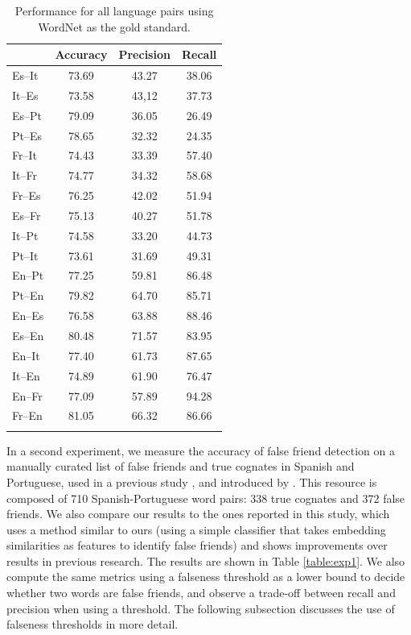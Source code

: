 \documentclass[output=paper]{langsci/langscibook}
\begin{document}
\vfill
\begin{table}[H]
\begin{tabular}{lccc}
\lsptoprule
& Accuracy & Precision & Recall\\
\midrule
Es--It & 73.69 & 43.27 & 38.06 \\
It--Es & 73.58 & 43,12 & 37.73 \\
Es--Pt & 79.09 & 36.05 & 26.49 \\
Pt--Es & 78.65 & 32.32 & 24.35 \\
Fr--It & 74.43 & 33.39 & 57.40 \\
It--Fr & 74.77 & 34.32 & 58.68 \\
Fr--Es & 76.25 & 42.02 & 51.94 \\
Es--Fr & 75.13 & 40.27 & 51.78 \\
It--Pt & 74.58 & 33.20 & 44.73 \\
Pt--It & 73.61 & 31.69 & 49.31 \\
\midrule
En--Pt & 77.25 & 59.81 & 86.48 \\
Pt--En & 79.82 & 64.70 & 85.71 \\
En--Es & 76.58 & 63.88 & 88.46 \\
Es--En & 80.48 & 71.57 & 83.95 \\
En--It & 77.40 & 61.73 & 87.65 \\
It--En & 74.89 & 61.90 & 76.47 \\
En--Fr & 77.09 & 57.89 & 94.28 \\
Fr--En & 81.05 & 66.32 & 86.66 \\
\lspbottomrule
\end{tabular}
\caption{\label{table:results_ff}Performance for all language pairs using WordNet as the gold standard.}
\end{table}
\vfill\pagebreak




In a second experiment, we measure the accuracy of false friend detection on a manually curated list of false friends and true cognates in Spanish and Portuguese, used in a previous study \citep{cognatesuban:castro2018high}, and introduced by \citet{cognatesuban:torres2011using}. This resource is composed of 710 Spanish-Portuguese word pairs: 338 true cognates and 372 false friends. We also compare our results to the ones reported in this study, which uses a method similar to ours (using a simple classifier that takes embedding similarities as features to identify false friends) and shows improvements over results in previous research. The results are shown in Table \ref{table:exp1}. We also compute the same metrics using a falseness threshold as a lower bound to decide whether two words are false friends, and observe a trade-off between recall and precision when using a threshold. The following subsection discusses the use of falseness thresholds in more detail.
\end{document}
